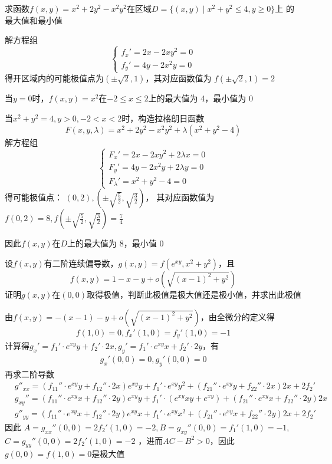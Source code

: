\documentclass{article}
\begin{document}
\begin{examplle}[]
求函数\(f(x,y)=x^2+2y^2-x^2y^2\)在区域\(D=\{(x,y)\mid x^2+y^2\le4,y\ge0\}\)上
的最大值和最小值

解方程组
\begin{equation*}
\begin{cases}
f_x'=2x-2xy^2=0\\
f_y' =4y-2x^2y=0
\end{cases}
\end{equation*}
得开区域内的可能极值点为\((\pm\sqrt{2},1)\)，其对应函数值为
\(f(\pm\sqrt{2},1)=2\)

当\(y=0\)时，\(f(x,y)=x^2\)在\(-2\le x\le 2\)上的最大值为 4，最小值为 0

当\(x^2+y^2=4,y>0,-2<x<2\)时，构造拉格朗日函数
\begin{equation*}
F(x,y,\lambda)=x^2+2y^2-x^2y^2+\lambda(x^2+y^2-4)
\end{equation*}
解方程组
\begin{equation*}
\begin{cases}
F_x'=2x-2xy^2+2\lambda x=0\\
F_y' =4y-2x^2y+2\lambda y=0\\
F_\lambda' =x^2+y^2-4=0
\end{cases}
\end{equation*}
得可能极值点：
\(\displaystyle(0,2),\left(\pm\sqrt{\frac{5}{2}},\sqrt{\frac{3}{2}}\right)\)，
其对应函数值为
\(f(0,2)=8,f\left(\pm\sqrt{\frac{5}{2}},\sqrt{\frac{3}{2}}\right)=\frac{7}{4}\)

因此\(f(x,y)\)在\(D\)上的最大值为 8，最小值 0
\end{examplle}

\begin{examplle}[]
设\(f(x,y)\)有二阶连续偏导数，\(g(x,y)=f(e^{xy},x^2+y^2)\)，且
\begin{equation*}
f(x,y)=1-x-y+o(\sqrt{(x-1)^2+y^2})
\end{equation*}
证明\(g(x,y)\)在\((0,0)\)取得极值，判断此极值是极大值还是极小值，并求出此极值

由\(f(x,y)=-(x-1)-y+o(\sqrt{(x-1)^2+y^2})\)，由全微分的定义得
\begin{gather*}
f(1,0)=0,f_x'(1,0)=f_y'(1,0)=-1
\end{gather*}
计算得\(g_x'=f_1'\cdot e^{xy}y+f_2'\cdot 2x,g_y'=f_1'\cdot e^{xy}x+f_2'\cdot
   2y\)，有
\begin{gather*}
g_x'(0,0)=0,g_y'(0,0)=0
\end{gather*}
再求二阶导数
\begin{align*}
&g''_{xx}=(f_{11}''\cdot e^{xy}y+f_{12}''\cdot 2x)e^{xy}y+f_1'\cdot e^{xy}y^2+
(f_{21}''\cdot e^{xy}y+f_{22}''\cdot 2x)2x+2f_2'\\
&g_{xy}''=(f_{11}''\cdot e^{xy}x+f_{12}''\cdot 2y)e^{xy}y+f_1'\cdot(e^{xy}xy+e^{xy})+
(f_{21}''\cdot e^{xy}x+f_{22}''\cdot 2y)2x\\
&g''_{yy}=(f_{11}''\cdot e^{xy}x+f_{12}''\cdot 2y)e^{xy}x+f_1'\cdot e^{xy}x^2+
(f_{21}''\cdot e^{xy}x+f_{22}''\cdot 2y)2x+2f_2'
\end{align*}
因此
\(A=g_{xx}''(0,0)=2f_2'(1,0)=-2,B=g_{xy}''(0,0)=f_1'(1,0)=-1\),\(C=g_{yy}''(0,0)=2f_2'(1,0)=-2\)
，进而\(AC-B^2>0\)，因此\(g(0,0)=f(1,0)=0\)是极大值
\end{examplle}
\end{document}
